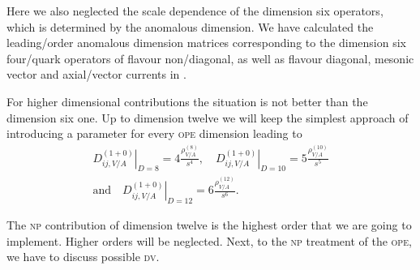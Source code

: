 \documentclass[../../index.tex]{subfiles}
\begin{document}
Here we also neglected the scale dependence of the dimension six operators,
which is determined by the anomalous dimension. We have calculated the
leading\-/order anomalous dimension matrices corresponding to the dimension six
four\-/quark operators of flavour non\-/diagonal, as well as flavour diagonal,
mesonic vector and axial\-/vector currents in \cite{Boito2015}.

For higher dimensional contributions the situation is not better than the
dimension six one. Up to dimension twelve we will keep the simplest approach of
introducing a parameter for every \textsc{ope} dimension leading to
\begin{equation}
  \begin{split}
    \left. D_{ij,V/A}^{(1+0)} \right\rvert_{D=8} = 4 \frac{\rho_{V/A}^{(8)}}{s^4}, \quad
    \left. D_{ij,V/A}^{(1+0)} \right\rvert_{D=10} = 5 \frac{\rho_{V/A}^{(10)}}{s^5} \\
    \text{and} \quad
    \left. D_{ij,V/A}^{(1+0)} \right\rvert_{D=12} = 6 \frac{\rho_{V/A}^{(12)}}{s^6}.
  \end{split} 
\end{equation}

The \textsc{np} contribution of dimension twelve is the highest order that we are
going to implement. Higher orders will be neglected. Next, to the \textsc{np}
treatment of the \textsc{ope}, we have to discuss possible \textsc{dv}.
\end{document}
